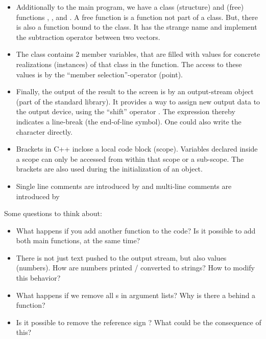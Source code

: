 \begin{itemize}
  \item Additionally to the main program, we have a class (structure)  and (free) functions , , and .
        A free function is a function not part of a class. But, there is also a function bound to the class. It has the strange name
         and implement the subtraction operator between two vectors.

  \item The class  contains 2 member variables, that are filled with values for concrete realizations (instances) of that class in the
         function. The access to these values is by the ``member selection''-operator  (point).

  \item Finally, the output of the result to the screen is by an output-stream object  (part of the standard library). It provides
        a way to assign new output data to the output device, using the ``shift'' operator \cpp{<<}. The expression  thereby indicates
        a line-break (the end-of-line symbol). One could also write the character  directly.

  \item Brackets \cpp{{ }} in C++ inclose a local code block (scope). Variables declared inside a scope can only be accessed from within that scope
        or a sub-scope. The brackets are also used during the initialization of an object.

  \item Single line comments are introduced by \cpp{//} and multi-line comments are introduced by 
\end{itemize}

Some questions to think about:
\begin{itemize}
  \item What happens if you add another  function to the code? Is it possible to add both main functions,
         at the same time?
  \item There is not just text pushed to the output stream, but also values (numbers). How are numbers printed / converted to strings? How to modify
        this behavior?
  \item What happens if we remove all s in argument lists? Why is there a  behind a function?
  \item Is it possible to remove the reference sign \cpp{&}? What could be the consequence of this?
\end{itemize}


